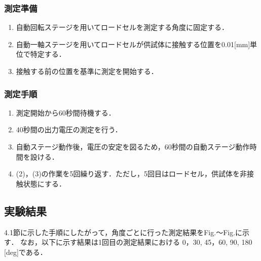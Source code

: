 \subsubsection{測定準備}
\begin{enumerate}[(1)]
  \item 自動回転ステージを用いてロードセルを測定する角度に固定する．
  \item 自動一軸ステージを用いてロードセルが供試体に接触する位置を0.01[mm]単位で特定する．
  \item 接触する前の位置を基準に測定を開始する．
\end{enumerate}
\subsubsection{測定手順}
\begin{enumerate}[(1)]
  \item 測定開始から60秒間待機する．
  \item 40秒間の出力電圧の測定を行う．
  \item 自動ステージ動作後，電圧の安定を図るため，60秒間の自動ステージ動作時間を設ける．
  \item (2)，(3)の作業を5回繰り返す．ただし，5回目はロードセル，供試体を非接触状態にする．
\end{enumerate}

\subsection{実験結果}

4.1節に示した手順にしたがって，角度ごとに行った測定結果をFig.～Fig.に示す．
なお，以下に示す結果は1回目の測定結果における 0，30, 45，60, 90, 180 [deg]である．

